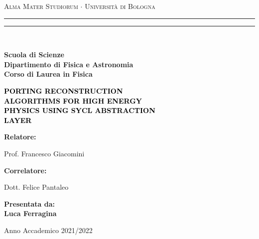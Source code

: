 \documentclass[12pt,a4paper]{report}
\begin{document}
\begin{titlepage}
\begin{center}
{{\Large{\textsc{Alma Mater Studiorum $\cdot$ Universit\`a di Bologna}}}} 
\rule[0.1cm]{15.8cm}{0.1mm}
\rule[0.5cm]{15.8cm}{0.6mm}
\\\vspace{3mm}

{\small{\bf Scuola di Scienze \\ 
Dipartimento di Fisica e Astronomia\\
Corso di Laurea in Fisica}}

\end{center}

\vspace{23mm}

\begin{center}\textcolor{black}{
{\LARGE{\bf PORTING RECONSTRUCTION \\ ALGORITHMS FOR HIGH ENERGY \\ PHYSICS USING SYCL ABSTRACTION \\ LAYER \\}}
}\end{center}

\vspace{50mm} \par \noindent

\begin{minipage}[t]{0.47\textwidth}

\large{\bf Relatore: \vspace{2mm}

{Prof. Francesco Giacomini}}

\vspace{5mm}

\large{\bf Correlatore: \vspace{2mm}

{Dott. Felice Pantaleo}}

\end{minipage}
%
\hfill
%
\begin{minipage}[t]{0.47\textwidth}\raggedleft
{\large{\bf Presentata da:
\vspace{2mm}\\
Luca Ferragina}}
\end{minipage}

\vspace{20mm}

\begin{center}
Anno Accademico 2021/2022
\end{center}

\end{titlepage}
\end{document}
